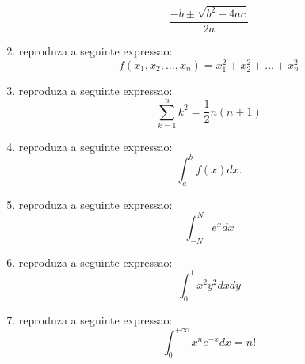 \documentclass[12pt,a4paper]{report}
\begin{document}
\begin{enumerate}
$$\frac{-b\pm\sqrt{b^2-4ac}}{2a}$$


\item reproduza a seguinte expressao:
$$f(x_1,x_2,\dots,x_n)=x_1^2+x_2^2+...+x_n^2$$

\item reproduza a seguinte expressao:
$$\sum_{k=1}^{n}k^2=\frac{1}{2}n(n+1)$$

\item reproduza a seguinte expressao:
$$\int_{a}^{b}f(x)dx.$$

\item reproduza a seguinte expressao:
$$\int_{-N}^{N}e^xdx$$

\item reproduza a seguinte expressao:
$$\int_{0}^{1}x^2y^2dxdy$$

\item reproduza a seguinte expressao:
$$\int_{0}^{+\infty}x^ne^{-x}dx=n!$$



\end{enumerate}
\end{document}
